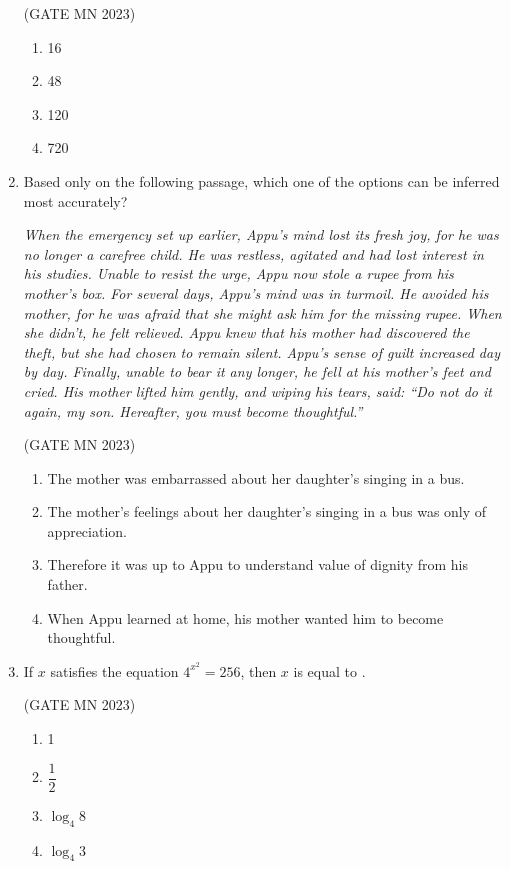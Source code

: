 \documentclass[journal]{IEEEtran}
\begin{document}
\begin{enumerate}
	\hfill(GATE MN 2023)
\begin{multicols}{4}
\begin{enumerate}
    \item 16  
    \item 48  
    \item 120  
    \item 720  
\end{enumerate}
\end{multicols}



\item Based only on the following passage, which one of the options can be inferred most accurately?  

\textit{When the emergency set up earlier, Appu’s mind lost its fresh joy, for he was no longer a carefree child. He was restless, agitated and had lost interest in his studies. Unable to resist the urge, Appu now stole a rupee from his mother’s box. For several days, Appu’s mind was in turmoil. He avoided his mother, for he was afraid that she might ask him for the missing rupee. When she didn’t, he felt relieved. Appu knew that his mother had discovered the theft, but she had chosen to remain silent. Appu’s sense of guilt increased day by day. Finally, unable to bear it any longer, he fell at his mother’s feet and cried. His mother lifted him gently, and wiping his tears, said: “Do not do it again, my son. Hereafter, you must become thoughtful.”}  



\hfill(GATE MN 2023)
\begin{enumerate}
    \item The mother was embarrassed about her daughter’s singing in a bus.  
    \item The mother’s feelings about her daughter’s singing in a bus was only of appreciation.  
    \item Therefore it was up to Appu to understand value of dignity from his father.  
    \item When Appu learned at home, his mother wanted him to become thoughtful.  

\end{enumerate}

    \item If $x$ satisfies the equation $4^{x^2} = 256$, then $x$ is equal to \underline{\hspace{2cm}}.
    

	    \hfill(GATE MN 2023)
    \begin{multicols}{4}
    \begin{enumerate}
        \item 1
        \item $\dfrac{1}{2}$
        \item $\log_{4} 8$
        \item $\log_{4} 3$
    \end{enumerate}
    \end{multicols}


\end{enumerate}
\end{document}
